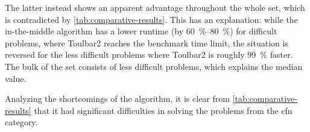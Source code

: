 The latter instead shows an apparent advantage throughout the whole set, which is contradicted by \cref{tab:comparative-results}.
This has an explanation: while the in-the-middle algorithm has a lower runtime (by \SIrange{60}{80}{\percent}) for difficult problems, where Toulbar2 reaches the benchmark time limit, the situation is reversed for the less difficult problems where Toulbar2 is roughly \SI{99}{\percent} faster.
The bulk of the set consists of less difficult problems, which explains the median value.

Analyzing the shortcomings of the algorithm, it is clear from \cref{tab:comparative-results} that it had significant difficulties in solving the problems from the \gls{cfn} category.









